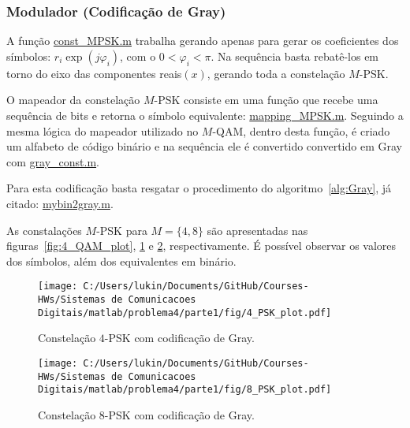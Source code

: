 \subsubsection{Modulador (Codificação de Gray)}

A função \href{https://raw.githubusercontent.com/lucasabdalah/Courses-HWs/SCD/Sistemas%20de%20Comunicacoes%20Digitais/matlab/problema4/parte1/const_MPSK.m}{\colorbox{gray!20}{\color{red} const\_MPSK.m}} trabalha gerando apenas para gerar os coeficientes dos símbolos: $r_i \exp(j\varphi_i)$, com o $ 0 < \varphi_i < \pi $. Na sequência basta rebatê-los em torno do eixo das componentes reais$(x)$, gerando toda a constelação $M$-PSK.

O mapeador da constelação $M$-PSK consiste em uma função  que recebe uma sequência de bits e retorna o símbolo equivalente: \href{https://raw.githubusercontent.com/lucasabdalah/Courses-HWs/SCD/Sistemas%20de%20Comunicacoes%20Digitais/matlab/problema4/parte1/mapping_MPSK.m}{\colorbox{gray!20}{\color{red}mapping\_MPSK.m}}. Seguindo a mesma lógica do mapeador utilizado no $M$-QAM, dentro desta função, é criado um alfabeto de código binário e na sequência ele é convertido convertido em Gray com \href{https://raw.githubusercontent.com/lucasabdalah/Courses-HWs/SCD/Sistemas%20de%20Comunicacoes%20Digitais/matlab/gray_const.m}{\colorbox{gray!20}{\color{red} gray\_const.m}}. 

Para esta codificação basta resgatar o procedimento do algoritmo~\ref{alg:Gray}, já citado: \href{https://raw.githubusercontent.com/lucasabdalah/Courses-HWs/SCD/Sistemas%20de%20Comunicacoes%20Digitais/matlab/mybin2gray.m}{\colorbox{gray!20}{\color{red} mybin2gray.m}}.

As constalações $M$-PSK para $M = \{4, 8\}$ são apresentadas nas figuras~\ref{fig:4_QAM_plot}, \ref{fig:4_PSK_plot} e \ref{fig:8_PSK_plot}, respectivamente. É possível observar os valores dos símbolos, além dos equivalentes em binário.


\begin{figure}[!ht]
    \centering
    \texttt{[image: C:/Users/lukin/Documents/GitHub/Courses-HWs/Sistemas de Comunicacoes Digitais/matlab/problema4/parte1/fig/4\_PSK\_plot.pdf]}
    \caption{Constelação $4$-PSK com codificação de Gray.}
    \label{fig:4_PSK_plot}
\end{figure}

\begin{figure}[!ht]
    \centering
    \texttt{[image: C:/Users/lukin/Documents/GitHub/Courses-HWs/Sistemas de Comunicacoes Digitais/matlab/problema4/parte1/fig/8\_PSK\_plot.pdf]}
    \caption{Constelação $8$-PSK com codificação de Gray.}
    \label{fig:8_PSK_plot}
\end{figure}

